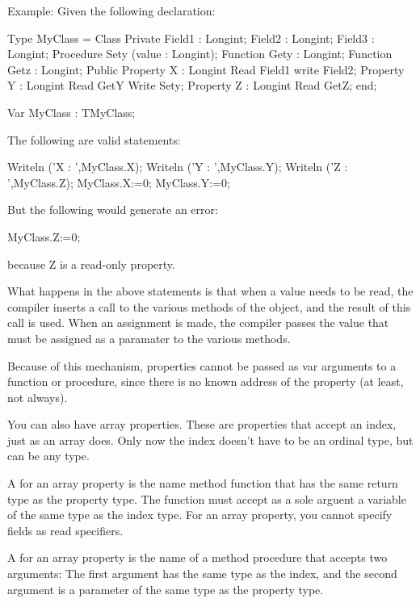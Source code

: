 \documentclass{report}
\begin{document}
Example:
Given the following declaration:
\begin{listing}
Type
  MyClass = Class
    Private
    Field1 : Longint;
    Field2 : Longint;
    Field3 : Longint;
    Procedure  Sety (value : Longint);
    Function Gety : Longint; 
    Function Getz : Longint;
    Public
    Property X : Longint Read Field1 write Field2;
    Property Y : Longint Read GetY Write Sety;
    Property Z : Longint Read GetZ;
    end;

Var MyClass : TMyClass; 
\end{listing}
The following are valid statements:
\begin{listing}
Writeln ('X : ',MyClass.X);
Writeln ('Y : ',MyClass.Y);
Writeln ('Z : ',MyClass.Z);
MyClass.X:=0;
MyClass.Y:=0;
\end{listing}
But the following would generate an error:
\begin{listing}
MyClass.Z:=0;
\end{listing}
because Z is a read-only property.

What happens in the above statements is that when a value needs to be read,
the compiler inserts a call to the various  methods of the
object, and the result of this call is used. When an assignment is made, 
the compiler passes the value that must be assigned as a paramater to 
the various  methods.

Because of this mechanism, properties cannot be passed as var arguments to a
function or procedure, since there is no known address of the property (at
least, not always).

You can also have array properties. These are properties that accept an
index, just as an array does. Only now the index doesn't have to be an 
ordinal type, but can be any type.

A  for an array property is the name method function 
that has the same return type as  the property type. 
The function must accept as a sole arguent a variable of the same type as 
the index type. For an array property, you cannot specify fields as read 
specifiers. 

A  for an array property is the name of a method 
procedure that accepts two arguments: The first argument has the same 
type as the index, and the second argument is a parameter of the same 
type as the property type.
\end{document}
